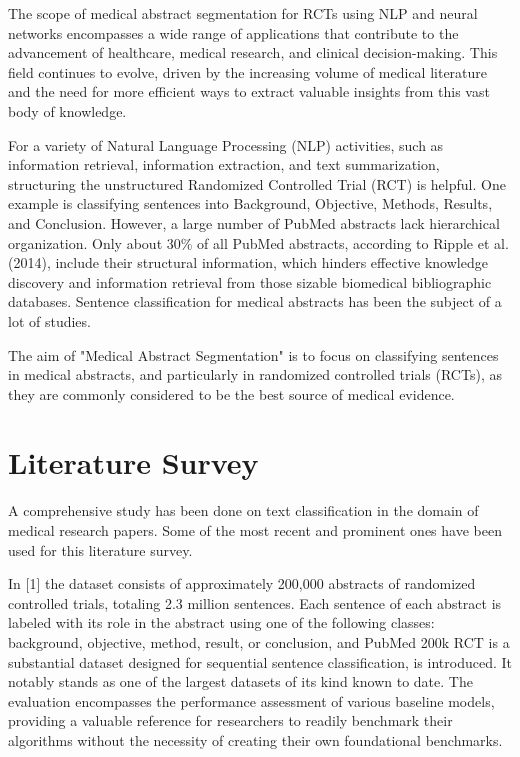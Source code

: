 \documentclass[conference]{IEEEtran}
\begin{document}
The scope of medical abstract segmentation for RCTs using NLP and neural networks encompasses a wide range of applications that contribute to the advancement of healthcare, medical research, and clinical decision-making. This field continues to evolve, driven by the increasing volume of medical literature and the need for more efficient ways to extract valuable insights from this vast body of knowledge.

For a variety of Natural Language Processing (NLP) activities, such as information retrieval, information extraction, and text summarization, structuring the unstructured Randomized Controlled Trial (RCT) is helpful. One example is classifying sentences into Background, Objective, Methods, Results, and Conclusion. However, a large number of PubMed abstracts lack hierarchical organization. Only about 30\% of all PubMed abstracts, according to Ripple et al. (2014), include their structural information, which hinders effective knowledge discovery and information retrieval from those sizable biomedical bibliographic databases. Sentence classification for medical abstracts has been the subject of a lot of studies. 

The aim of "Medical Abstract Segmentation" is to focus on classifying sentences in medical abstracts, and particularly in randomized controlled trials (RCTs), as they are commonly considered to be the best source of medical evidence.

 


\section{Literature Survey}

A comprehensive study has been done on text classification in the domain of medical research papers. Some of the most recent and prominent ones have been used for this literature survey. 

In [1] the dataset consists of approximately 200,000 abstracts of randomized controlled trials, totaling 2.3 million sentences. Each sentence of each abstract is labeled with its role in the abstract using one of the following classes: background, objective, method, result, or conclusion, and PubMed 200k RCT is a substantial dataset designed for sequential sentence classification, is introduced. It notably stands as one of the largest datasets of its kind known to date. The evaluation encompasses the performance assessment of various baseline models, providing a valuable reference for researchers to readily benchmark their algorithms without the necessity of creating their own foundational benchmarks.
\end{document}
